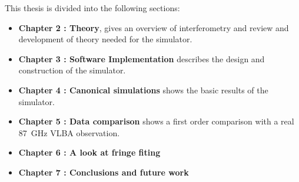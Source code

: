 This thesis is divided into the following sections:
\begin{itemize}
 \item {\bf Chapter 2 : Theory}, gives an overview of interferometry and review and development of theory needed for the simulator.
 \item {\bf Chapter 3 : Software Implementation} describes the design and construction of the simulator.
 \item {\bf Chapter 4 : Canonical simulations} shows the basic results of the simulator.
 \item {\bf Chapter 5 : Data comparison} shows a first order comparison with a real 87~GHz VLBA observation.
 \item {\bf Chapter 6 : A look at fringe fiting}
 \item {\bf Chapter 7 : Conclusions and future work}
 
\end{itemize}
















